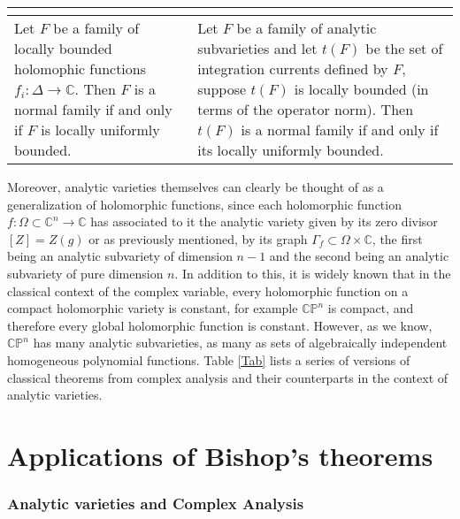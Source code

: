 \documentclass[12pt,twoside,a4paper]{report}
\newcommand{\co}{\ensuremath{\mathbb C }}
\newcommand{\con}{\ensuremath{\mathbb{C}^n}}
\newcommand{\cp}{\ensuremath{\mathbb{CP}}}
\newcommand{\om}{\ensuremath{\Omega}}
\begin{document}
\begin{table}[h!]
\begin{tabular}{| m{5cm} | m{5cm} |}
\begin{center}
                            \end{center}\\
                            \midrule
                                    Let $F$ be a family of locally bounded
                                    holomophic functions $f_i:\Delta\rightarrow\co$.
                                    Then $F$ is a normal family if and only if $F$ is locally uniformly bounded.
                                         &
                                    Let $F$ be a family of analytic subvarieties and let $t(F)$
                                    be the set of integration currents defined by $F$, suppose $t(F)$
                                    is locally bounded (in terms of the operator norm).
                                    Then $t(F)$ is a normal family if and only if its locally uniformly bounded.\\
                            \bottomrule
            \end{tabular}
\end{table}

Moreover, analytic varieties themselves can clearly be thought of as a generalization of holomorphic functions, since each holomorphic function $f:\om\subset\con\rightarrow\co$ has associated to it the analytic variety given by its zero divisor $[Z]=Z(g)$ or as previously mentioned, by its graph $\Gamma_{f}\subset\om\times\co$, the first being an analytic subvariety of dimension $n-1$ and the second being an analytic subvariety of pure dimension $n$. In addition to this, it is widely known that in the classical context of the complex variable, every holomorphic function on a compact holomorphic variety is constant, for example $\cp^n$ is compact, and therefore every global holomorphic function is constant. However, as we know, $\cp^n$ has many analytic subvarieties, as many as sets of algebraically independent homogeneous polynomial functions. Table \ref{Tab} lists a series of versions of classical theorems from complex analysis and their counterparts in the context of analytic varieties.

\chapter{Applications of Bishop's theorems}
\pagestyle{fancy}
\fancyhf{}
\fancyhead[LE]{\rightmark}
\fancyhead[RO]{\leftmark}
\fancyfoot[C]{\thepage}
\subsection{Analytic varieties and Complex Analysis}
\end{document}
